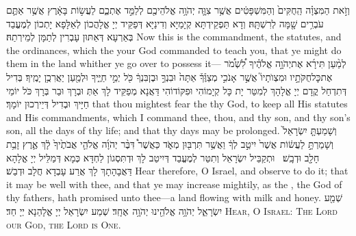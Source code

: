 \newperek
{}%
{וְזֹ֣את הַמִּצְוָ֗ה הַֽחֻקִּים֙ וְהַמִּשְׁפָּטִ֔ים אֲשֶׁ֥ר צִוָּ֛ה יְהֹוָ֥ה אֱלֹהֵיכֶ֖ם לְלַמֵּ֣ד אֶתְכֶ֑ם לַעֲשׂ֣וֹת בָּאָ֔רֶץ אֲשֶׁ֥ר אַתֶּ֛ם עֹבְרִ֥ים שָׁ֖מָּה לְרִשְׁתָּֽהּ׃}
{וְדָא תַּפְקֵידְתָּא קְיָמַיָּא וְדִינַיָּא דְּפַקֵּיד יְיָ אֱלָהֲכוֹן לְאַלָּפָא יָתְכוֹן לְמֶעֱבַד בְּאַרְעָא דְּאַתּוּן עָבְרִין לְתַמָּן לְמֵירְתַהּ׃}
{Now this is the commandment, the statutes, and the ordinances, which the \lord\space your God commanded to teach you, that ye might do them in the land whither ye go over to possess it—}{}
{לְמַ֨עַן תִּירָ֜א אֶת\maqqaf יְהֹוָ֣ה אֱלֹהֶ֗יךָ לִ֠שְׁמֹ֠ר אֶת\maqqaf כׇּל\maqqaf חֻקֹּתָ֣יו וּמִצְוֺתָיו֮ אֲשֶׁ֣ר אָנֹכִ֣י מְצַוֶּ֒ךָ֒ אַתָּה֙ וּבִנְךָ֣ וּבֶן\maqqaf בִּנְךָ֔ כֹּ֖ל יְמֵ֣י חַיֶּ֑יךָ וּלְמַ֖עַן יַאֲרִכֻ֥ן יָמֶֽיךָ׃}
{בְּדִיל דְּתִדְחַל קֳדָם יְיָ אֱלָהָךְ לְמִטַּר יָת כָּל קְיָמוֹהִי וּפִקּוֹדוֹהִי דַּאֲנָא מְפַקֵּיד לָךְ אַתְּ וּבְרָךְ וּבַר בְּרָךְ כֹּל יוֹמֵי חַיָּיךְ וּבְדִיל דְּיֵירְכוּן יוֹמָךְ׃}
{that thou mightest fear the \lord\space thy God, to keep all His statutes and His commandments, which I command thee, thou, and thy son, and thy son’s son, all the days of thy life; and that thy days may be prolonged.}{}
{וְשָׁמַעְתָּ֤ יִשְׂרָאֵל֙ וְשָׁמַרְתָּ֣ לַעֲשׂ֔וֹת אֲשֶׁר֙ יִיטַ֣ב לְךָ֔ וַאֲשֶׁ֥ר תִּרְבּ֖וּן מְאֹ֑ד כַּאֲשֶׁר֩ דִּבֶּ֨ר יְהֹוָ֜ה אֱלֹהֵ֤י אֲבֹתֶ֙יךָ֙ לָ֔ךְ אֶ֛רֶץ זָבַ֥ת חָלָ֖ב וּדְבָֽשׁ׃ \petucha }
{וּתְקַבֵּיל יִשְׂרָאֵל וְתִטַּר לְמֶעֱבַד דְּיִיטַב לָךְ וּדְתִּסְגוֹן לַחְדָּא כְּמָא דְּמַלֵּיל יְיָ אֱלָהָא דַּאֲבָהָתָךְ לָךְ אֲרַע עָבְדָא חֲלָב וּדְבַשׁ׃}
{Hear therefore, O Israel, and observe to do it; that it may be well with thee, and that ye may increase mightily, as the \lord, the God of thy fathers, hath promised unto thee—a land flowing with milk and honey.}{}
{שְׁמַ֖{\large ע} יִשְׂרָאֵ֑ל יְהֹוָ֥ה אֱלֹהֵ֖ינוּ יְהֹוָ֥ה \pasek  אֶחָֽ{\large ד}׃}
{שְׁמַע יִשְׂרָאֵל יְיָ אֱלָהַנָא יְיָ חַד׃}
{\textsc{Hear, O Israel: The Lord our God, the Lord is One.}}{}
